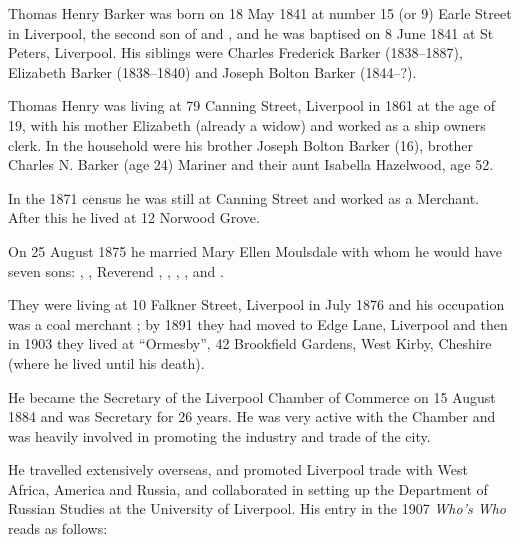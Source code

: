 
Thomas Henry Barker was born on 18 May 1841\cite{THBbirth} at number 15 (or 9\cite{THBbirth}) Earle Street in Liverpool,\cite{THBplantagenets} the second son of  and , and he was baptised on 8 June 1841 at St Peters, Liverpool.\cite{THBarkerBaptism} His siblings were Charles Frederick Barker (1838--1887),  Elizabeth Barker (1838--1840) and Joseph Bolton Barker (1844--?).

Thomas Henry was living at 79 Canning Street, Liverpool in 1861 at the age of 19, with his mother Elizabeth (already a widow) and worked as a ship owners clerk.  In the household were his brother Joseph Bolton Barker (16), brother Charles N. Barker (age 24) Mariner and their aunt Isabella Hazelwood, age 52.

In the 1871 census he was still at Canning Street and worked as a Merchant. After this he lived at 12 Norwood Grove\cite{THBcensus}.

On 25 August 1875 he married Mary Ellen Moulsdale\cite{THBmarriage} with whom he would have seven sons:\cite{THBplantagenets} , , Reverend , , , 
, and .

They were living at 10 Falkner Street, Liverpool in July 1876 and his occupation was a coal merchant \cite{THBoccupation};  by 1891 they had moved to Edge Lane, Liverpool\cite{THBresidence} and then in 1903 they lived at ``Ormesby'', 42 Brookfield Gardens, West Kirby, Cheshire (where he lived until his death).\cite{THBdeathcert}

He became the Secretary of the Liverpool Chamber of Commerce on 15 August 1884 and was Secretary for 26 years.  He was very active with the Chamber and was heavily involved in promoting the industry and trade of the city.  

He travelled extensively overseas, and promoted Liverpool trade with West Africa, America and Russia, and collaborated in setting up the Department of Russian Studies at the University of Liverpool. His entry in  the 1907 \emph{Who's Who} reads as follows:

